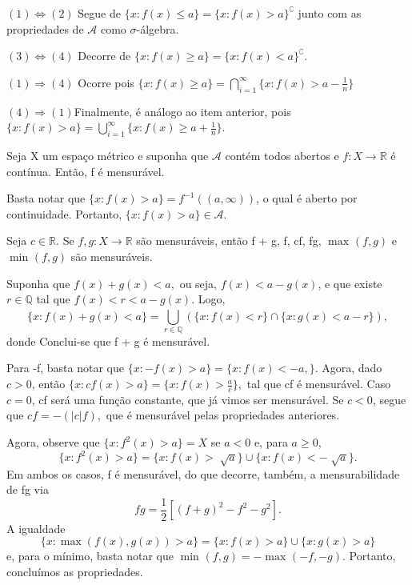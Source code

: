 \documentclass[measure_theory.tex]{subfiles}
\begin{document}
\begin{proof*}
	\((1) \Longleftrightarrow (2)\) Segue de \(\{x: f(x) \leq a\} = \{x: f(x) > a\}^{\complement}\) junto com as propriedades de \(\mathcal{A}\) como \(\sigma \)-álgebra.

	\((3) \Longleftrightarrow (4)\) Decorre de \(\{x: f(x) \geq a\} = \{x: f(x) < a\}^{\complement}.\)

	\((1) \Rightarrow (4)\) Ocorre pois \(\{x: f(x)\geq a\} = \bigcap_{i=1}^{\infty}\biggl\{x: f(x) > a - \frac{1}{n}\biggr\}\)

	\((4) \Rightarrow (1)\)Finalmente, é análogo ao item anterior, pois \(\{x: f(x) > a\} = \bigcup_{i=1}^{\infty}\biggl\{x: f(x)\geq a + \frac{1}{n}\biggr\}\). \qedsymbol
\end{proof*}
\begin{prop*}
	Seja X um espaço métrico e suponha que \( \mathcal{A}\) contém todos abertos e \(f:X\rightarrow \mathbb{R}\) é contínua. Então, f é mensurável.
\end{prop*}
\begin{proof*}
	Basta notar que \(\{x: f(x) > a\} = f^{-1}((a, \infty))\), o qual é aberto por continuidade. Portanto, \(\{x: f(x) > a\}\in \mathcal{A}\). \qedsymbol
\end{proof*}
\begin{prop*}
	Seja \(c\in \mathbb{R}.\) Se \(f, g:X\rightarrow \mathbb{R}\) são mensuráveis, então f + g, f, cf, fg, \(\max_{}(f, g)\) e \(\min_{}(f, g)\) são mensuráveis.
\end{prop*}
\begin{proof*}
	Suponha que \(f(x) + g(x) < a,\) ou seja, \(f(x) < a - g(x)\), e que existe \(r\in \mathbb{Q}\) tal que \(f(x) < r < a-g(x).\) Logo,
	\[
		\{x: f(x) + g(x) < a\} = \bigcup_{r\in \mathbb{Q}}^{}(\{x: f(x) < r\}\cap \{x: g(x) < a -r\}),
	\]
	donde Conclui-se que f + g é mensurável.

	Para -f, basta notar que \(\{x: -f(x) > a\} = \{x: f(x) < -a,\}\). Agora, dado \(c > 0\), então \(\{x: cf(x) > a\} = \{x: f(x) > \frac{a}{c}\},\) tal que cf é mensurável.
	Caso \(c=0\), cf será uma função constante, que já vimos ser mensurável. Se \(c < 0\), segue que \(cf = -(|c|f),\) que é mensurável pelas propriedades anteriores.

	Agora, observe que \(\{x: f^{2}(x) > a\} = X\) se \(a < 0\) e, para \(a \geq 0\),
	\[
		\{x: f^{2}(x) > a\} = \{x: f(x) > \sqrt[]{a}\}\cup \{x: f(x) < -\sqrt[]{a}\}.
	\]
	Em ambos os casos, f é mensurável, do que decorre, também, a mensurabilidade de fg via
	\[
		fg = \frac{1}{2}[(f+g)^{2} - f^{2}-g^{2}].
	\]
	A igualdade
	\[
		\{x:\max_{}(f(x), g(x)) > a\} = \{x: f(x) > a\}\cup \{x: g(x) > a\}
	\]
	e, para o mínimo, basta notar que \(\min_{}(f, g) = -\max_{}(-f, -g).\) Portanto, concluímos as propriedades. \qedsymbol
\end{proof*}
\end{document}
